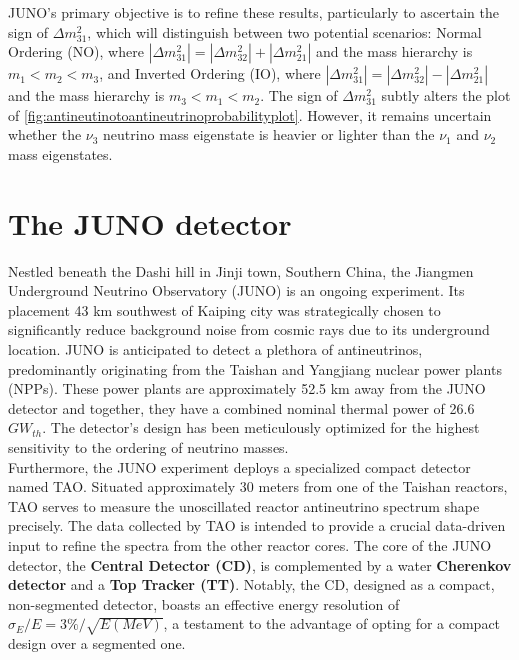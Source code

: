 JUNO's primary objective is to refine these results, particularly to ascertain the sign of $\Delta m_{31}^2$, which will distinguish between two potential scenarios: Normal Ordering (NO), where $\left|\Delta m_{31}^2\right|=\left|\Delta m_{32}^2\right|+\left|\Delta m_{21}^2\right|$ and the mass hierarchy is $m_1<m_2<m_3$, and Inverted Ordering (IO), where $\left|\Delta m_{31}^2\right|=\left|\Delta m_{32}^2\right|-\left|\Delta m_{21}^2\right|$ and the mass hierarchy is $m_3<m_1<m_2$. The sign of $\Delta m_{31}^2$ subtly alters the plot of \ref{fig:antineutinotoantineutrinoprobabilityplot}. However, it remains uncertain whether the $\nu_3$ neutrino mass eigenstate is heavier or lighter than the $\nu_1$ and $\nu_2$ mass eigenstates.


\section{The JUNO detector}

Nestled beneath the Dashi hill in Jinji town, Southern China, the Jiangmen Underground Neutrino Observatory (JUNO) is an ongoing experiment. Its placement 43 km southwest of Kaiping city was strategically chosen to significantly reduce background noise from cosmic rays due to its underground location. JUNO is anticipated to detect a plethora of antineutrinos, predominantly originating from the Taishan and Yangjiang nuclear power plants (NPPs). These power plants are approximately 52.5 km away from the JUNO detector and together, they have a combined nominal thermal power of 26.6 $GW_{th}$. The detector's design has been meticulously optimized for the highest sensitivity to the ordering of neutrino masses.\\

Furthermore, the JUNO experiment deploys a specialized compact detector named TAO. Situated approximately 30 meters from one of the Taishan reactors, TAO serves to measure the unoscillated reactor antineutrino spectrum shape precisely. The data collected by TAO is intended to provide a crucial data-driven input to refine the spectra from the other reactor cores. The core of the JUNO detector, the \textbf{Central Detector (CD)}, is complemented by a water \textbf{Cherenkov detector} and a \textbf{Top Tracker (TT)}. Notably, the CD, designed as a compact, non-segmented detector, boasts an effective energy resolution of $\sigma_E/E =3\% / \sqrt{E (MeV)}$, a testament to the advantage of opting for a compact design over a segmented one.\\

